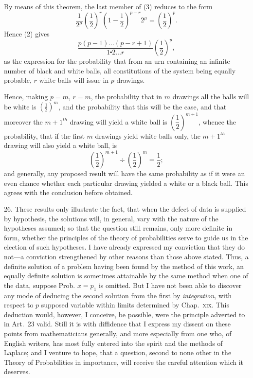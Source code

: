 \documentclass[oneside]{book}
\begin{document}
By means of this theorem, the last member of (3) reduces to
the form
\[
  \frac{1}{2^\mu} \left(\frac{1}{2}\right)^r
  \left(1 - \frac{1}{2}\right)^{p-r} 2^\mu
= \left(\frac{1}{2}\right)^p .
\]
Hence (2) gives
\[
  \frac{p(p-1)\dotsc (p-r+1)}
       {1\centerdot 2\dotsc r}
  \left( \frac{1}{2} \right)^p ,
\]
as the expression for the probability that from an urn containing
an infinite number of black and white balls, all constitutions of
the system being equally probable, $r$ white balls will issue in $p$
drawings.

Hence, making $p = m$, $r = m$, the probability that in $m$ drawings
all the balls will be white is $\left( \frac{1}{2} \right)^m$, and the probability that this
will be the case, and that moreover the ${m + 1}^{th}$ drawing will
yield a white ball is $\left(\dfrac{1}{2}\right)^{m+1}$, whence the probability, that if the
first $m$ drawings yield white balls only, the ${m + 1}^{th}$ drawing will
also yield a white ball, is
\[
  \left( \frac{1}{2} \right)^{m+1} \div
  \left( \frac{1}{2} \right)^m  = \frac{1}{2};
\]
and generally, any proposed result will have the same probability
as if it were an even chance whether each particular drawing
yielded a white or a black ball. This agrees with the conclusion
before obtained.

26. These results only illustrate the fact, that when the defect
of data is supplied by hypothesis, the solutions will, in general,
vary with the nature of the hypotheses assumed; so that the
question still remains, only more definite in form, whether the
principles of the theory of probabilities serve to guide us in the
election of such hypotheses. I have already expressed my conviction that they do not---a conviction strengthened by other reasons
than those above stated. Thus, a definite solution of a problem
having been found by the method of this work, an equally definite solution is sometimes attainable by the same method when
one of the data, suppose Prob. $x =p_1$ is omitted. But I have not
been able to discover any mode of deducing the second solution
from the first by \emph{integration}, with respect to $p$ supposed variable
within limits determined by Chap.~\textsc{xix}. This deduction would,
however, I conceive, be possible, were the principle adverted to
in Art.~23 valid. Still it is with diffidence that I express my
dissent on these points from mathematicians generally, and more
especially from one who, of English writers, has most fully entered into the spirit and the methods of Laplace; and I venture
to hope, that a question, second to none other in the Theory of
Probabilities in importance, will receive the careful attention
which it deserves.
\end{document}
